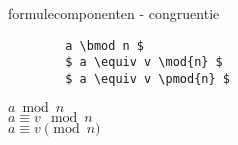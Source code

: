 \begin{frame}[fragile]{formulecomponenten - congruentie}
    \begin{verbatim}
        a \bmod n $
        $ a \equiv v \mod{n} $
        $ a \equiv v \pmod{n} $
    \end{verbatim}
    \begin{tcolorbox}[width=11cm, size=small]
        $a \bmod n $ \\
        $ a \equiv v \mod{n} $ \\
        $ a \equiv v \pmod{n} $
    \end{tcolorbox}

\end{frame}